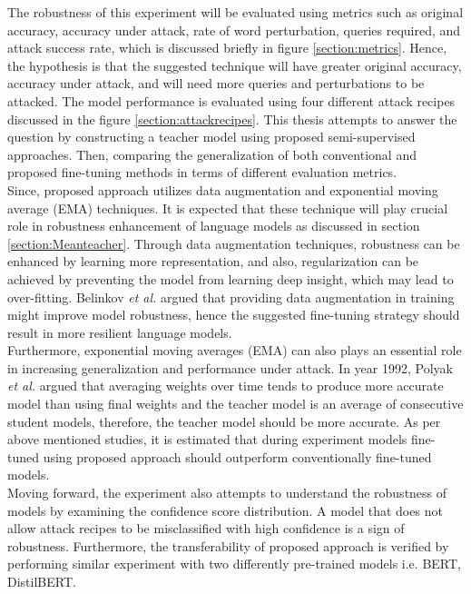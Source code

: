 \documentclass[%
	BCOR=8mm, %
	DIV=12,
	toc=bibliography, %
	toc=listof, %
	oneside, %
	egregdoesnotlikesansseriftitles, %
	]{scrbook}
\begin{document}
The robustness of this experiment will be evaluated using metrics such as original accuracy, accuracy under attack, rate of word perturbation, queries required, and attack success rate, which is discussed briefly in figure \ref{section:metrics}. Hence, the hypothesis is that the suggested technique will have greater original accuracy, accuracy under attack, and will need more queries and perturbations to be attacked. The model performance is evaluated using four different attack recipes discussed in the figure \ref{section:attackrecipes}. This thesis attempts to answer the question by constructing a teacher model using proposed semi-supervised approaches. Then, comparing the generalization of both conventional and proposed fine-tuning methods in terms of different evaluation metrics. \\
Since, proposed approach utilizes data augmentation and exponential moving average (EMA) techniques. It is expected that these technique will play crucial role in robustness enhancement of language models as discussed in section \ref{section:Meanteacher}. Through data augmentation techniques, robustness can be enhanced by learning more representation, and also, regularization can be achieved by preventing the model from learning deep insight, which may lead to over-fitting. Belinkov \textit{et al.} \cite{belinkov_synthetic_2018} argued that providing data augmentation in training might improve model robustness, hence the suggested fine-tuning strategy should result in more resilient language models.\\
Furthermore, exponential moving averages (EMA) can also plays an essential role in increasing generalization and performance under attack. In year 1992, Polyak \textit{et al.} \cite{polyak_acceleration_1992} argued that averaging weights over time tends to produce more accurate model than using final weights and the teacher model is an average of consecutive student models, therefore, the teacher model should be more accurate. As per above mentioned studies, it is estimated that during experiment models fine-tuned using proposed approach should outperform conventionally fine-tuned models. \\
Moving forward, the experiment also attempts to understand the robustness of models by examining the confidence score distribution. A model that does not allow attack recipes to be misclassified with high confidence is a sign of robustness. Furthermore, the transferability of proposed approach is verified by performing similar experiment with two differently pre-trained models i.e. BERT, DistilBERT.
\end{document}
